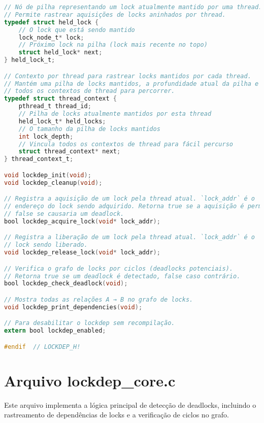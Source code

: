 \begin{lstlisting}[language=C, caption={lockdep.h - API de detecção de deadlocks}]
// Nó de pilha representando um lock atualmente mantido por uma thread.
// Permite rastrear aquisições de locks aninhados por thread.
typedef struct held_lock {
    // O lock que está sendo mantido
    lock_node_t* lock;
    // Próximo lock na pilha (lock mais recente no topo)
    struct held_lock* next;
} held_lock_t;

// Contexto por thread para rastrear locks mantidos por cada thread.
// Mantém uma pilha de locks mantidos, a profundidade atual da pilha e vincula
// todos os contextos de thread para percorrer.
typedef struct thread_context {
    pthread_t thread_id;
    // Pilha de locks atualmente mantidos por esta thread
    held_lock_t* held_locks;
    // O tamanho da pilha de locks mantidos
    int lock_depth;
    // Vincula todos os contextos de thread para fácil percurso
    struct thread_context* next;
} thread_context_t;

void lockdep_init(void);
void lockdep_cleanup(void);

// Registra a aquisição de um lock pela thread atual. `lock_addr` é o
// endereço do lock sendo adquirido. Retorna true se a aquisição é permitida,
// false se causaria um deadlock.
bool lockdep_acquire_lock(void* lock_addr);

// Registra a liberação de um lock pela thread atual. `lock_addr` é o
// lock sendo liberado.
void lockdep_release_lock(void* lock_addr);

// Verifica o grafo de locks por ciclos (deadlocks potenciais).
// Retorna true se um deadlock é detectado, false caso contrário.
bool lockdep_check_deadlock(void);

// Mostra todas as relações A → B no grafo de locks.
void lockdep_print_dependencies(void);

// Para desabilitar o lockdep sem recompilação.
extern bool lockdep_enabled;

#endif  // LOCKDEP_H!
\end{lstlisting}

\section{Arquivo lockdep\_core.c}

Este arquivo implementa a lógica principal de detecção de deadlocks, incluindo o rastreamento de dependências de locks e a verificação de ciclos no grafo.

